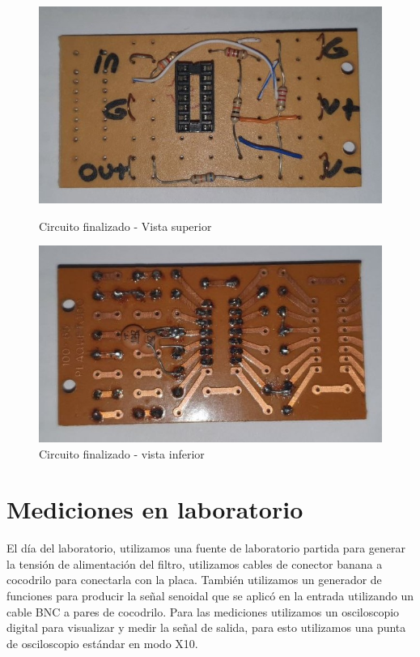 \documentclass[11pt,a4paper]{report}
\begin{document}
\begin{figure}[h]
    \centering
    \begin{minipage}{0.45\textwidth}
\centering
\includegraphics[scale=0.30]{figs/pcb_1.jpg}
\caption{Circuito finalizado - Vista superior}
    \end{minipage}\hfill
    \begin{minipage}{0.45\textwidth}
\centering
\includegraphics[scale=0.32]{figs/pcb_2.jpg}
\caption{Circuito finalizado - vista inferior}
    \end{minipage}
\end{figure}

\chapter{Mediciones en laboratorio}

El día del laboratorio, utilizamos una fuente de laboratorio partida para generar la tensión de alimentación del filtro, utilizamos cables de conector banana a cocodrilo para conectarla con la placa. También utilizamos un generador de funciones para producir la señal senoidal que se aplicó en la entrada utilizando un cable BNC a pares de cocodrilo.
Para las mediciones utilizamos un osciloscopio digital para visualizar y medir la señal de salida, para esto utilizamos una punta de osciloscopio estándar en modo X10.
\end{document}
